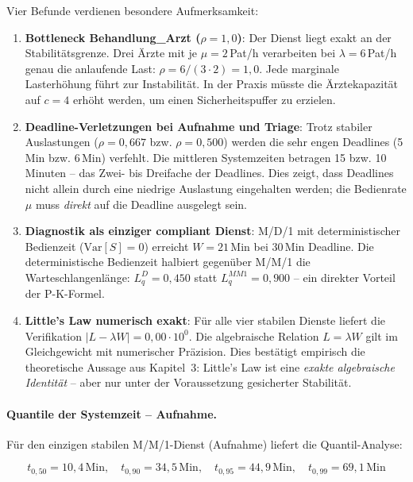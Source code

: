 ﻿\documentclass[a4paper,12pt]{scrreprt}
\theoremstyle{definition}
\begin{document}
Vier Befunde verdienen besondere Aufmerksamkeit:

\begin{enumerate}
	\item[-] \textbf{Bottleneck Behandlung\_Arzt ($\rho = 1{,}0$)}: Der
	Dienst liegt exakt an der Stabilitätsgrenze. Drei Ärzte mit je
	$\mu = 2$\,Pat/h verarbeiten bei $\lambda = 6$\,Pat/h genau
	die anlaufende Last: $\rho = 6/(3 \cdot 2) = 1{,}0$.
	Jede marginale Lasterhöhung führt zur Instabilität.
	In der Praxis müsste die Ärztekapazität auf $c=4$ erhöht werden,
	um einen Sicherheitspuffer zu erzielen.
	
	\item[-] \textbf{Deadline-Verletzungen bei Aufnahme und Triage}:
	Trotz stabiler Auslastungen ($\rho = 0{,}667$ bzw. $\rho = 0{,}500$)
	werden die sehr engen Deadlines (5\,Min bzw. 6\,Min) verfehlt.
	Die mittleren Systemzeiten betragen 15 bzw. 10\,Minuten --
	das Zwei- bis Dreifache der Deadlines. Dies zeigt, dass Deadlines
	nicht allein durch eine niedrige Auslastung eingehalten werden;
	die Bedienrate $\mu$ muss \emph{direkt} auf die Deadline ausgelegt sein.
	
	\item[-] \textbf{Diagnostik als einziger compliant Dienst}: M/D/1
	mit deterministischer Bedienzeit ($\mathrm{Var}[S]=0$) erreicht
	$W = 21$\,Min bei 30\,Min Deadline. Die deterministische Bedienzeit
	halbiert gegenüber M/M/1 die Warteschlangenlänge:
	$L_q^{D} = 0{,}450$ statt $L_q^{MM1} = 0{,}900$ -- ein direkter
	Vorteil der P-K-Formel.
	
	\item[-] \textbf{Little's Law numerisch exakt}:
	Für alle vier stabilen Dienste liefert die Verifikation
	$|L - \lambda W| = 0{,}00 \cdot 10^0$. Die algebraische
	Relation $L = \lambda W$ gilt im Gleichgewicht mit numerischer
	Präzision. Dies bestätigt empirisch die theoretische Aussage aus
	Kapitel~3: Little's Law ist eine \emph{exakte algebraische Identität}
	-- aber nur unter der Voraussetzung gesicherter Stabilität.
\end{enumerate}

\paragraph{Quantile der Systemzeit -- Aufnahme.}
Für den einzigen stabilen M/M/1-Dienst (Aufnahme) liefert die Quantil-Analyse:

\begin{equation}
	t_{0{,}50} = 10{,}4\,\text{Min}, \quad
	t_{0{,}90} = 34{,}5\,\text{Min}, \quad
	t_{0{,}95} = 44{,}9\,\text{Min}, \quad
	t_{0{,}99} = 69{,}1\,\text{Min}
\end{equation}
\end{document}
